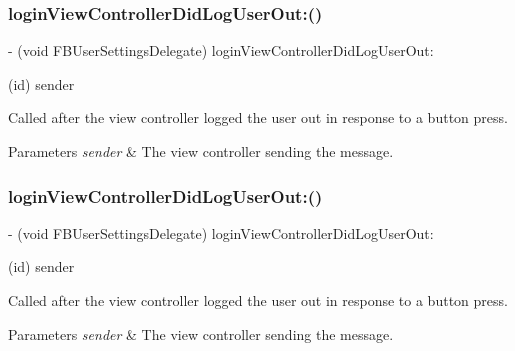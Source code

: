 \subsubsection{\texorpdfstring{login\+View\+Controller\+Did\+Log\+User\+Out\+:()}{loginViewControllerDidLogUserOut:()}\hspace{0.1cm}{\footnotesize\ttfamily [3/5]}}
{\footnotesize\ttfamily -\/ (void F\+B\+User\+Settings\+Delegate) login\+View\+Controller\+Did\+Log\+User\+Out\+: \begin{DoxyParamCaption}\item[{(id)}]{sender }\end{DoxyParamCaption}\hspace{0.3cm}{\ttfamily [optional]}}

Called after the view controller logged the user out in response to a button press.


\begin{DoxyParams}{Parameters}
{\em sender} & The view controller sending the message. \\
\hline
\end{DoxyParams}
\mbox{\label{protocolFBUserSettingsDelegate_01-p_a6e8b97e1802353fbbc0c5058189a3f79}} 
\subsubsection{\texorpdfstring{login\+View\+Controller\+Did\+Log\+User\+Out\+:()}{loginViewControllerDidLogUserOut:()}\hspace{0.1cm}{\footnotesize\ttfamily [4/5]}}
{\footnotesize\ttfamily -\/ (void F\+B\+User\+Settings\+Delegate) login\+View\+Controller\+Did\+Log\+User\+Out\+: \begin{DoxyParamCaption}\item[{(id)}]{sender }\end{DoxyParamCaption}\hspace{0.3cm}{\ttfamily [optional]}}

Called after the view controller logged the user out in response to a button press.


\begin{DoxyParams}{Parameters}
{\em sender} & The view controller sending the message. \\
\hline
\end{DoxyParams}
\mbox{\label{protocolFBUserSettingsDelegate_01-p_a6e8b97e1802353fbbc0c5058189a3f79}} 
